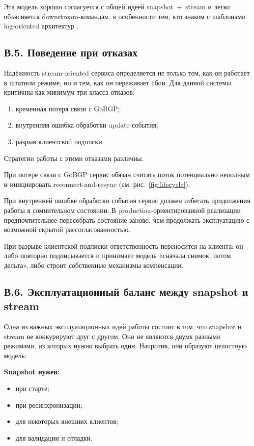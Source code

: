 Эта модель хорошо согласуется с общей идеей snapshot~+~stream и
легко объясняется downstream-командам, в особенности тем, кто знаком
с шаблонами log-oriented архитектур \cite{kleppmann2017ddia}.

\subsection*{В.5. Поведение при отказах}

Надёжность stream-oriented сервиса определяется не только тем, как он
работает в штатном режиме, но и тем, как он переживает сбои. Для
данной системы критичны как минимум три класса отказов:

\begin{enumerate}
\item временная потеря связи с GoBGP;
\item внутренняя ошибка обработки update-события;
\item разрыв клиентской подписки.
\end{enumerate}

Стратегии работы с этими отказами различны.

При потере связи с GoBGP сервис обязан считать поток потенциально
неполным и инициировать reconnect-and-resync (см. рис.~\ref{fig:lifecycle}).

При внутренней ошибке обработки события сервис должен избегать
продолжения работы в сомнительном состоянии. В production-ориентированной
реализации предпочтительнее пересобрать состояние заново, чем
продолжать эксплуатацию с возможной скрытой рассогласованностью.

При разрыве клиентской подписки ответственность переносится на
клиента: он либо повторно подписывается и принимает модель «сначала
снимок, потом дельта», либо строит собственные механизмы компенсации.

\subsection*{В.6. Эксплуатационный баланс между snapshot и stream}

Одна из важных эксплуатационных идей работы состоит в том, что
snapshot и stream не конкурируют друг с другом. Они не являются двумя
разными режимами, из которых нужно выбрать один. Напротив, они
образуют целостную модель:

\textbf{Snapshot нужен:}

\begin{itemize}
\item при старте;
\item при ресинхронизации;
\item для некоторых внешних клиентов;
\item для валидации и отладки.
\end{itemize}

